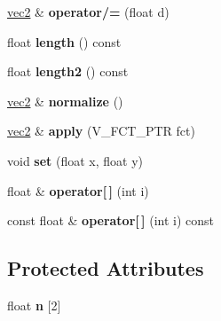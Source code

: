 \begin{DoxyCompactItemize}
\item 
\hypertarget{classvec2_aeed76056ef7b692e489212f1c36ff113}{\hyperlink{classvec2}{vec2} \& {\bfseries operator/=} (float d)}\label{classvec2_aeed76056ef7b692e489212f1c36ff113}

\item 
\hypertarget{classvec2_a0858db6efbcc16f47e09de36711988ba}{float {\bfseries length} () const }\label{classvec2_a0858db6efbcc16f47e09de36711988ba}

\item 
\hypertarget{classvec2_a3d77d0f16519820514ce621975253672}{float {\bfseries length2} () const }\label{classvec2_a3d77d0f16519820514ce621975253672}

\item 
\hypertarget{classvec2_a2aa2180a727a575f4844ce5c878a5f55}{\hyperlink{classvec2}{vec2} \& {\bfseries normalize} ()}\label{classvec2_a2aa2180a727a575f4844ce5c878a5f55}

\item 
\hypertarget{classvec2_a83760a59314805cdebf8d5bc87253944}{\hyperlink{classvec2}{vec2} \& {\bfseries apply} (V\-\_\-\-F\-C\-T\-\_\-\-P\-T\-R fct)}\label{classvec2_a83760a59314805cdebf8d5bc87253944}

\item 
\hypertarget{classvec2_a27df9a22ceb4deb3a3d3bb8ad1a25f9c}{void {\bfseries set} (float x, float y)}\label{classvec2_a27df9a22ceb4deb3a3d3bb8ad1a25f9c}

\item 
\hypertarget{classvec2_a33d77eb8386bd5b7a4ed4b54e5805cb3}{float \& {\bfseries operator\mbox{[}$\,$\mbox{]}} (int i)}\label{classvec2_a33d77eb8386bd5b7a4ed4b54e5805cb3}

\item 
\hypertarget{classvec2_a14de5b60648d9b0c27f63fb9fd7ad560}{const float \& {\bfseries operator\mbox{[}$\,$\mbox{]}} (int i) const }\label{classvec2_a14de5b60648d9b0c27f63fb9fd7ad560}

\end{DoxyCompactItemize}
\subsection*{Protected Attributes}
\begin{DoxyCompactItemize}
\item 
\hypertarget{classvec2_a909babb02077ca16742cdeefc894528a}{float {\bfseries n} \mbox{[}2\mbox{]}}\label{classvec2_a909babb02077ca16742cdeefc894528a}

\end{DoxyCompactItemize}
